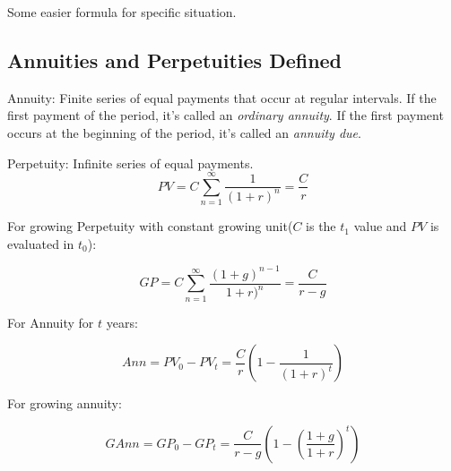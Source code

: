 \documentclass[10pt, a4paper]{article}
\begin{document}
        Some easier formula for specific situation. 

        \subsection{Annuities and Perpetuities Defined}
        
        Annuity: Finite series of equal payments that occur at regular intervals. If the first payment of the period, it's called an \emph{ordinary annuity}. If the first payment occurs at the beginning of the period, it's called an \emph{annuity due}. 

        Perpetuity: Infinite series of equal payments.
        $$PV = C\sum_{n = 1}^{\infty}\frac{1}{(1 + r)^n} = \frac{C}{r}$$

        For growing Perpetuity with constant growing unit($C$ is the $t_1$ value and $PV$ is evaluated in $t_0$): 

        $$GP = C\sum_{n = 1}^{\infty}\frac{(1 + g)^{n - 1}}{{1 + r)^n}} = \frac{C}{r - g}$$

        For Annuity for $t$ years:

        $$Ann = PV_{0} - PV_{t} = \frac{C}{r}( 1 - \frac{1}{(1 + r)^t})$$

        For growing annuity:

        $$GAnn = GP_0 - GP_t = \frac{C}{r - g}(1 - (\frac{1 + g}{1 + r})^t)$$
\end{document}
